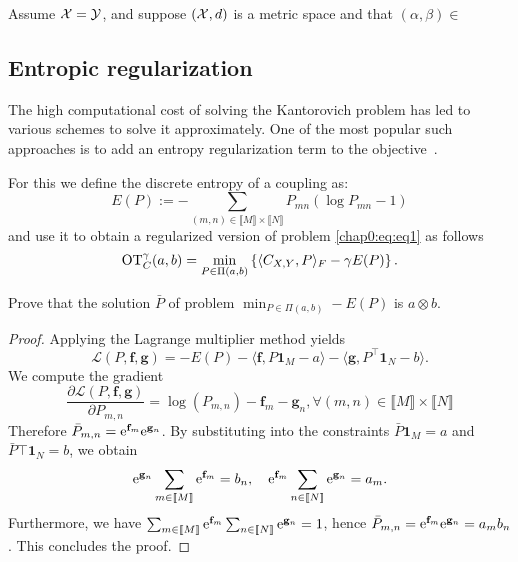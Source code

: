 \begin{proposition}
Assume $\mathcal{X} = \mathcal{Y}$, and suppose $(\mathcal{X}, d)$ is a metric space and that $(\alpha, \beta) \in $
\end{proposition}



\subsection{Entropic regularization}
\label{subsec:entropic}


The high computational cost of solving the Kantorovich problem has led to various schemes to solve it approximately. One of the most popular such approaches is to add an entropy regularization term to the objective~\cite{Cuturi13}.

For this we define the discrete entropy of a coupling as: 
\begin{equation*}
E(P) :=  -  \sum_{(m,n)   \in  \llbracket  M\rrbracket   \times  \llbracket
  N\rrbracket} P_{mn} (\log P_{mn}  -1)
\end{equation*}
and use it to obtain a regularized version of problem \eqref{chap0:eq:eq1} as follows
\begin{equation}
  \label{chap0:eq:eq2}
  \mathrm{OT}_{C}^{\gamma}(a, b) = \min_{P \in \Pi(a, b)}
  \left\{\langle C_{X,Y}, P \rangle_F - \gamma E(P)\right\}.  
\end{equation}

\begin{lemma}
\label{chap0:lem:lem1} Prove that the solution $\bar{P}$ of problem
$\min_{P \in \Pi(a, b)} - E(P) $
is $a \otimes b$. 
\end{lemma}
\begin{proof}
Applying the Lagrange multiplier method yields
\begin{equation*}
\mathcal{L} (P, \mathbf{f}, \mathbf{g})  = -E(P) - \langle \mathbf{f}, P\mathbf{1}_M - a \rangle -\langle \mathbf{g}, P^{\top} \mathbf{1}_{N} -b \rangle. 
\end{equation*}
We compute the gradient
\begin{equation*}
\frac{\partial \mathcal{L}(P, \mathbf{f}, \mathbf{g}) }{\partial P_{m,n}} = \log(P_{m,n}) - \mathbf{f}_m - \mathbf{g}_n, \forall (m,n) \in \llbracket M \rrbracket \times \llbracket N \rrbracket
\end{equation*}
Therefore $\bar{P}_{m,n} = \mathrm{e}^{\mathbf{f}_m} \mathrm{e}^{\mathbf{g}_n}$. By substituting into the constraints $\bar{P} \mathbf{1}_M =a$ and $\bar{P}{\top} \mathbf{1}_N = b$, we obtain
\begin{equation*}
\mathrm{e}^{\mathbf{g}_n} \sum_{m \in \llbracket M \rrbracket} \mathrm{e}^{\mathbf{f}_m} = b_n, \quad \mathrm{e}^{\mathbf{f}_m} \sum_{n \in \llbracket N \rrbracket} \mathrm{e}^{\mathbf{g}_n} = a_m.
\end{equation*}
Furthermore, we have $\sum_{m \in \llbracket M \rrbracket} \mathrm{e}^{\mathbf{f}_m} \sum_{n \in \llbracket N \rrbracket} \mathrm{e}^{\mathbf{g}_n} = 1$, hence $\bar{P}_{m,n} =\mathrm{e}^{\mathbf{f}_m} \mathrm{e}^{\mathbf{g}_n} = a_m b_n$. This concludes the proof.
\end{proof}




